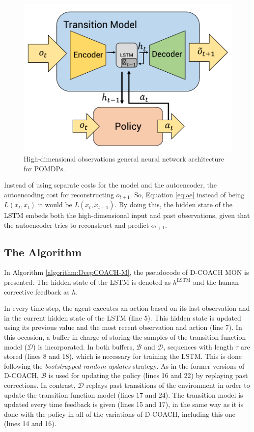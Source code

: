 \begin{figure}[h]
    \centering
    \includegraphics[width=0.6\linewidth]{imagenes/cap4/hd_model.pdf}
    \caption{High-dimensional observations general neural network architecture for POMDPs.}
    \label{fig:rnn_hd}
\end{figure}

Instead of using separate costs for the model and the autoencoder, the autoencoding cost for reconstructing $o_{t+1}$. So, Equation \ref{eq:ae} instead of being $L(x_{t},\widetilde x_{t})$ it would be  $L(x_{t},\widetilde x_{t+1})$. By doing this, the hidden state of the LSTM embeds both the high-dimensional input and past observations, given that the autoencoder tries to reconstruct and predict $o_{t+1}$.

\subsection{The Algorithm}

In Algorithm \ref{algorithm:DeepCOACH-M}, the pseudocode of D-COACH MON is presented. The hidden state of the LSTM is denoted as  $h^{\mathrm{LSTM}}$ and the human corrective feedback as $h$.

 In every time step, the agent executes an action based on its last observation and in the current hidden state of the LSTM (line 5). This hidden state is updated using its previous value and the most recent observation and action (line 7). In this occasion, a buffer in charge of storing the samples of the transition function model ($\mathcal{D}$) is incorporated. In both buffers, $\mathcal{B}$ and $\mathcal{D}$, sequences with length $\tau$ are stored (lines 8 and 18), which is necessary for training the LSTM. This is done following the \emph{bootstrapped random updates} \cite{hausknecht2015deep} strategy. As in the former versions of D-COACH, $\mathcal{B}$ is used for updating the policy (lines 16 and 22) by replaying past corrections. In contrast, $\mathcal{D}$ replays past transitions of the environment in order to update the transition function model (lines 17 and 24). The transition model is updated every time feedback is given (lines 15 and 17), in the same way as it is done with the policy in all of the variations of D-COACH, including this one (lines 14 and 16). 

